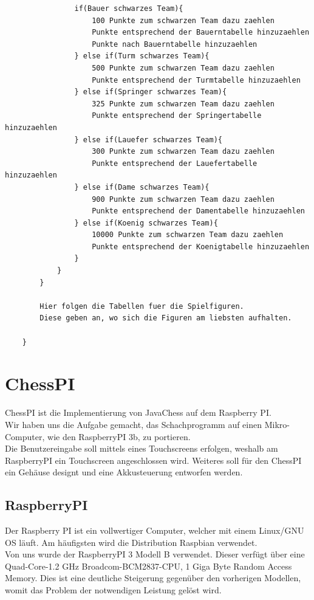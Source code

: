 \documentclass[12pt,a4paper]{article}
\begin{document}
\begin{lstlisting}
				if(Bauer schwarzes Team){
					100 Punkte zum schwarzen Team dazu zaehlen
					Punkte entsprechend der Bauerntabelle hinzuzaehlen
					Punkte nach Bauerntabelle hinzuzaehlen
				} else if(Turm schwarzes Team){
					500 Punkte zum schwarzen Team dazu zaehlen
					Punkte entsprechend der Turmtabelle hinzuzaehlen
				} else if(Springer schwarzes Team){
					325 Punkte zum schwarzen Team dazu zaehlen
					Punkte entsprechend der Springertabelle hinzuzaehlen
				} else if(Lauefer schwarzes Team){
					300 Punkte zum schwarzen Team dazu zaehlen
					Punkte entsprechend der Lauefertabelle hinzuzaehlen
				} else if(Dame schwarzes Team){
					900 Punkte zum schwarzen Team dazu zaehlen
					Punkte entsprechend der Damentabelle hinzuzaehlen
				} else if(Koenig schwarzes Team){
					10000 Punkte zum schwarzen Team dazu zaehlen
					Punkte entsprechend der Koenigtabelle hinzuzaehlen
				}
			}
		}
		
		Hier folgen die Tabellen fuer die Spielfiguren.
		Diese geben an, wo sich die Figuren am liebsten aufhalten.
		
	}	
\end{lstlisting}

\clearpage\vfill\newpage{}
\section{ChessPI}
\label{SEC:chesspi}

ChessPI ist die Implementierung von JavaChess auf dem Raspberry PI. \\
Wir haben uns die Aufgabe gemacht, das Schachprogramm auf einen Mikro-Computer, wie den RaspberryPI 3b, zu portieren.\\
Die Benutzereingabe soll mittels eines Touchscreens erfolgen, weshalb am RaspberryPI ein Touchscreen angeschlossen wird. Weiteres soll für den ChessPI ein Gehäuse designt und eine Akkusteuerung entworfen werden. \\

\subsection{RaspberryPI}

Der Raspberry PI ist ein vollwertiger Computer, welcher mit einem Linux/GNU OS läuft. Am häufigsten wird die Distribution Raspbian verwendet. \\
Von uns wurde der RaspberryPI 3 Modell B verwendet. Dieser verfügt über eine Quad-Core-1.2 GHz Broadcom-BCM2837-CPU, 1 Giga Byte Random Access Memory.\cite{RaspiSpecs} Dies ist eine deutliche Steigerung gegenüber den vorherigen Modellen, womit das Problem der notwendigen Leistung gelöst wird. \\
\end{document}
